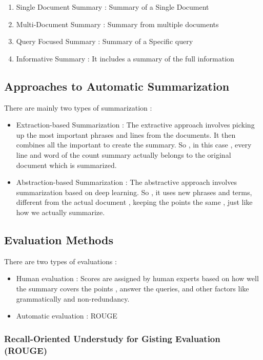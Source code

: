 \documentclass{article}
\begin{document}
\begin{enumerate}
    \item Single Document Summary : Summary of a Single Document
    \item Multi-Document Summary : Summary from multiple documents
    \item Query Focused Summary : Summary of a Specific query
    \item Informative Summary : It includes a summary of the full information
\end{enumerate}

\subsection{Approaches to Automatic Summarization}

There are mainly two types of summarization : 

\begin{itemize}
    \item Extraction-based Summarization  : The extractive approach involves picking up the most important phrases and lines from the documents. It then combines all the important to create the summary. So , in this case , every line and word of the count summary actually belongs to the original document which is summarized.
    \item Abstraction-based Summarization : The abstractive approach involves summarization based on deep learning. So , it uses new phrases and terms, different from the actual document , keeping the points the same , just like how we actually summarize.
\end{itemize}

\subsection{Evaluation Methods}

There are two types of evaluations : 

\begin{itemize}
    \item Human evaluation : Scores are assigned by human experts based on how well the summary covers the points , answer the queries, and other factors like grammatically and non-redundancy.
    \item Automatic evaluation : ROUGE
\end{itemize}

\subsubsection{Recall-Oriented Understudy for Gisting Evaluation (ROUGE)}
\end{document}
